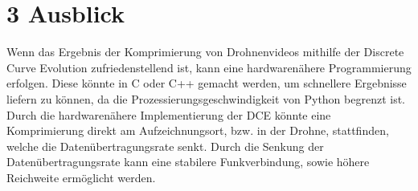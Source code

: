 \documentclass[a4paper,11pt,pdftex]{scrreport}
\begin{document}
\section*{3 Ausblick}
Wenn das Ergebnis der Komprimierung von Drohnenvideos mithilfe der Discrete Curve Evolution zufriedenstellend ist, kann eine hardwarenähere Programmierung erfolgen. Diese könnte in C oder C++ gemacht werden, um schnellere Ergebnisse liefern zu können, da die Prozessierungsgeschwindigkeit von Python begrenzt ist.\newline
Durch die hardwarenähere Implementierung der DCE könnte eine Komprimierung direkt am Aufzeichnungsort, bzw. in der Drohne, stattfinden, welche die Datenübertragungsrate senkt. Durch die Senkung der Datenübertragungsrate kann eine stabilere Funkverbindung, sowie höhere Reichweite ermöglicht werden.



\appendix




\setcounter{page}{1}
\listoffigures
\end{document}
